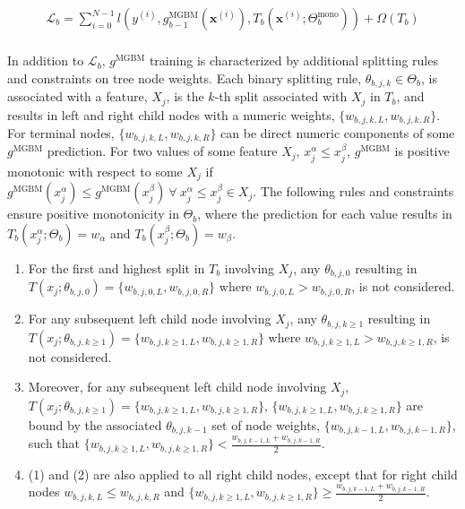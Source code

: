 \documentclass[information,article,submit,moreauthors,pdftex]{definitions/mdpi}
\begin{document}
\begin{equation}
\begin{aligned}
\mathcal{L}_{b} =\sum_{i=0}^{N-1}l(y^{(i)}, g^{\text{MGBM}}_{b-1}(\mathbf{x}^{(i)}), T_b(\mathbf{x}^{(i)};\Theta^\text{mono}_b)) + \Omega(T_b)\\
\end{aligned}
\end{equation}

\noindent In addition to $\mathcal{L}_{b}$, $g^\text{MGBM}$ training is characterized by additional splitting rules and constraints on tree node weights. Each binary splitting rule, $\theta_{b,j,k} \in \Theta_b$, is associated with a feature, $X_j$, is the $k$-th split associated with $X_j$ in $T_b$, and results in left and right child nodes with a numeric weights, $\{w_{b,j,k,L}, w_{b,j,k,R}\}$. For terminal nodes, $\{w_{b,j,k,L}, w_{b,j,k,R}\}$ can be direct numeric components of some $g^\text{MGBM}$ prediction. For two values of some feature $X_j$, $x^{\alpha}_j \le x^{\beta}_j$, $g^{\text{MGBM}}$ is positive monotonic with respect to some $X_j$ if $g^{\text{MGBM}}(x^{\alpha}_j) \le g^{\text{MGBM}}(x^{\beta}_j) ~\forall ~x^{\alpha}_j \le x^{\beta}_j \in X_j$. The following rules and constraints ensure positive monotonicity in $\Theta_b$, where the prediction for each value results in $T_b(x^{\alpha}_j; \Theta_b) = w_\alpha$ and $T_b(x^{\beta}_j; \Theta_b) = w_\beta$.

\begin{enumerate}[leftmargin=*,labelsep=4.9mm]
	\item For the first and highest split in $T_b$ involving $X_j$, any $\theta_{b,j,0}$ resulting in $T(x_j; \theta_{b,j,0}) = \{w_{b,j,0,L}, w_{b,j,0,R}\}$ where $w_{b,j,0,L} > w_{b,j,0,R}$, is not considered. 
	\item For any subsequent left child node involving $X_j$, any $\theta_{b,j, k\ge1}$ resulting in $T(x_j; \theta_{b,j,k\ge1}) = \{w_{b,j,k\ge1,L}, w_{b,j,k\ge1,R}\}$ where $w_{b,j,k\ge1,L} > w_{b,j,k\ge1,R}$, is not considered.
	\item Moreover, for any subsequent left child node involving $X_j$, $T(x_j; \theta_{b,j,k\ge1}) = \{w_{b,j,k\ge1,L}, w_{b,j,k\ge1,R}\}$, $\{w_{b,j,k\ge1,L}, w_{b,j,k\ge1,R}\}$ are bound by the associated $\theta_{b,j,k-1}$ set of node weights, $\{w_{b,j,k-1,L}, w_{b,j,k-1, R}\}$, such that $ \{w_{b,j,k\ge1,L}, w_{b,j,k\ge1,R}\} < \frac{w_{b,j,k-1,L} + w_{b,j,k-1,R}}{2}$.
	\item (1) and (2) are also applied to all right child nodes, except that for right child nodes $ w_{b,j,k,L} \le w_{b,j,k,R}$ and $\{w_{b,j,k\ge1,L}, w_{b,j,k\ge1,R}\} \ge \frac{w_{b,j,k-1,L} + w_{b,j,k-1,R}}{2}$.
\end{enumerate}
\end{document}
